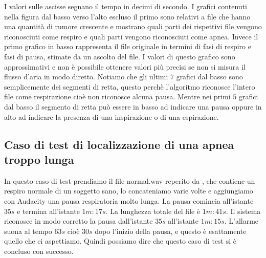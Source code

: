 I valori sulle ascisse segnano il tempo in decimi di secondo.
I grafici contenuti nella figura dal basso verso l'alto escluso il primo sono relativi a file che hanno una quantit\`a di rumore crescente e mostrano quali parti dei rispettivi file vengono riconosciuti come respiro e quali parti vengono riconosciuti come apnea.
Invece il primo grafico in basso rappresenta il file originale in termini di fasi di respiro e fasi di pausa, stimate da un ascolto del file.
I valori di questo grafico sono approssimativi e non \`e possibile ottenere valori pi\`u precisi se non si misura il flusso d'aria in modo diretto.
Notiamo che gli ultimi $7$ grafici dal basso sono semplicemente dei segmenti di retta, questo perch\`e l'algoritmo riconosce l'intero file come respirazione cio\`e non riconosce alcuna pausa. 
Mentre nei primi $5$ grafici dal basso il segmento di retta pu\`o essere in basso ad indicare una pausa oppure in alto ad indicare la presenza di una inspirazione o di una espirazione.



\subsection{Caso di test di localizzazione di una apnea troppo lunga}
In questo caso di test prendiamo il file normal.wav reperito da \cite{SoundRepositories}, che contiene un respiro normale di un soggetto sano, lo concateniamo varie volte e aggiungiamo con Audacity una pausa respiratoria molto lunga. 
La pausa comincia all'istante $35s$ e termina all'istante $1m:17s$. 
La lunghezza totale del file \`e $1m:41s$.
Il sistema riconosce in modo corretto la pausa dall'istante $35s$ all'istante $1m:15s$.
L'allarme suona al tempo $63s$ cio\`e $30s$ dopo l'inizio della pausa, e questo \`e esattamente quello che ci aspettiamo.
Quindi possiamo dire che questo caso di test si \`e concluso con successo.



% 



